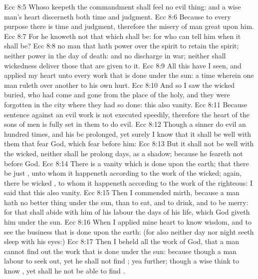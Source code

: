\vs Ecc 8:5 Whoso keepeth the commandment shall feel no evil thing: and a wise man's heart discerneth both time and judgment.
\vs Ecc 8:6 Because to every purpose there is time and judgment, therefore the misery of man  great upon him.
\vs Ecc 8:7 For he knoweth not that which shall be: for who can tell him when it shall be?
\vs Ecc 8:8  no man that hath power over the spirit to retain the spirit; neither  power in the day of death: and  no discharge in  war; neither shall wickedness deliver those that are given to it.
\vs Ecc 8:9 All this have I seen, and applied my heart unto every work that is done under the sun:  a time wherein one man ruleth over another to his own hurt.
\vs Ecc 8:10 And so I saw the wicked buried, who had come and gone from the place of the holy, and they were forgotten in the city where they had so done: this  also vanity.
\vs Ecc 8:11 Because sentence against an evil work is not executed speedily, therefore the heart of the sons of men is fully set in them to do evil.
\vs Ecc 8:12 Though a sinner do evil an hundred times, and his  be prolonged, yet surely I know that it shall be well with them that fear God, which fear before him:
\vs Ecc 8:13 But it shall not be well with the wicked, neither shall he prolong  days,  as a shadow; because he feareth not before God.
\vs Ecc 8:14 There is a vanity which is done upon the earth; that there be just , unto whom it happeneth according to the work of the wicked; again, there be wicked , to whom it happeneth according to the work of the righteous: I said that this also  vanity.
\vs Ecc 8:15 Then I commended mirth, because a man hath no better thing under the sun, than to eat, and to drink, and to be merry: for that shall abide with him of his labour the days of his life, which God giveth him under the sun.
\vs Ecc 8:16 When I applied mine heart to know wisdom, and to see the business that is done upon the earth: (for also  neither day nor night seeth sleep with his eyes:)
\vs Ecc 8:17 Then I beheld all the work of God, that a man cannot find out the work that is done under the sun: because though a man labour to seek  out, yet he shall not find ; yea further; though a wise  think to know , yet shall he not be able to find .
